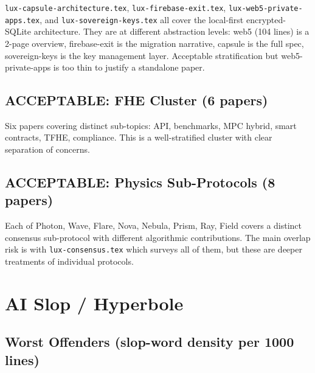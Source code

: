 \documentclass[11pt,a4paper]{article}
\begin{document}
\texttt{lux-capsule-architecture.tex}, \texttt{lux-firebase-exit.tex},
\texttt{lux-web5-private-apps.tex}, and \texttt{lux-sovereign-keys.tex} all
cover the local-first encrypted-SQLite architecture. They are at different
abstraction levels: web5 (104 lines) is a 2-page overview, firebase-exit is the
migration narrative, capsule is the full spec, sovereign-keys is the key
management layer. Acceptable stratification but web5-private-apps is too thin to
justify a standalone paper.

\subsection{ACCEPTABLE: FHE Cluster (6 papers)}

Six papers covering distinct sub-topics: API, benchmarks, MPC hybrid, smart
contracts, TFHE, compliance. This is a well-stratified cluster with clear
separation of concerns.

\subsection{ACCEPTABLE: Physics Sub-Protocols (8 papers)}

Each of Photon, Wave, Flare, Nova, Nebula, Prism, Ray, Field covers a distinct
consensus sub-protocol with different algorithmic contributions. The main
overlap risk is with \texttt{lux-consensus.tex} which surveys all of them, but
these are deeper treatments of individual protocols.

\section{AI Slop / Hyperbole}

\subsection{Worst Offenders (slop-word density per 1000 lines)}
\end{document}
